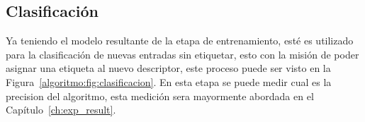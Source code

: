 		
	\subsection{Clasificación}
	\label{algoritmo:clasificacion}
		Ya teniendo el modelo resultante de la etapa de entrenamiento, esté es utilizado para la clasificación de nuevas entradas sin etiquetar, esto con la misión de poder asignar una etiqueta al nuevo descriptor, este proceso puede ser visto en la Figura~\ref{algoritmo:fig:clasificacion}. En esta etapa se puede medir cual es la precision del algoritmo, esta medición sera mayormente abordada en el Capítulo~\ref{ch:exp_result}.
		
	
	
	
	
	
	